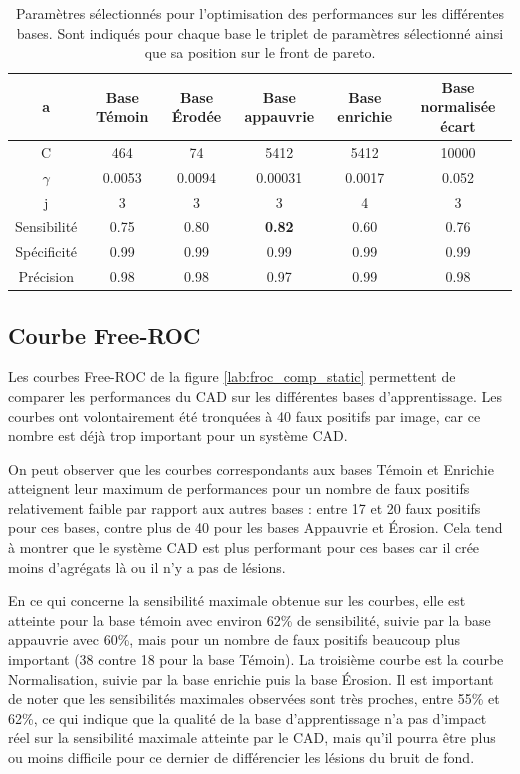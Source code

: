 \begin{table}[h!]
	\begin{center}
		\begin{tabular}{c c c c c c}
  \hline
  a	& Base Témoin 	& Base Érodée	& Base appauvrie& Base enrichie & Base normalisée écart\\
  \hline
 C 	& 464		& 74		& 5412		& 5412		& 10000 \\
\hline
$\gamma$& 0.0053	& 0.0094	& 0.00031	& 0.0017	& 0.052 \\
\hline
j	& 3		& 3		& 3		& 4		& 3	\\
\hline
\hline
Sensibilité& 0.75	& 0.80		& \textbf{0.82}		& 0.60		& 0.76	\\
\hline
Spécificité& 0.99	& 0.99		& 0.99		& 0.99		& 0.99 \\
\hline
Précision& 0.98		& 0.98		& 0.97		& 0.99		& 0.98 \\
\hline
 		\end{tabular}

	\end{center}
\caption{Paramètres sélectionnés pour l'optimisation des performances sur les différentes bases. Sont indiqués pour chaque base le triplet de paramètres sélectionné ainsi que sa position sur le front de pareto.}
\label{fig:paramsParams}
\end{table}

\FloatBarrier

\subsection{Courbe Free-ROC}

Les courbes Free-ROC de la figure \ref{lab:froc_comp_static} permettent de comparer les performances du CAD sur les différentes bases d'apprentissage. Les courbes ont volontairement été tronquées à 40 faux positifs par image, car ce nombre est déjà trop important pour un système CAD.

On peut observer que les courbes correspondants aux bases Témoin et Enrichie atteignent leur maximum de performances pour un nombre de faux positifs relativement faible par rapport aux autres bases : entre 17 et 20 faux positifs pour ces bases, contre plus de 40 pour les bases Appauvrie et Érosion. Cela tend à montrer que le système CAD est plus performant pour ces bases car il crée moins d'agrégats là ou il n'y a pas de lésions.

En ce qui concerne la sensibilité maximale obtenue sur les courbes, elle est atteinte pour la base témoin avec environ 62\% de sensibilité, suivie par la base appauvrie avec 60\%, mais pour un nombre de faux positifs beaucoup plus important (38 contre 18 pour la base Témoin). La troisième courbe est la courbe Normalisation, suivie par la base enrichie puis la base Érosion. Il est important de noter que les sensibilités maximales observées sont très proches, entre 55\% et 62\%, ce qui indique que la qualité de la base d'apprentissage n'a pas d'impact réel sur la sensibilité maximale atteinte par le CAD, mais qu'il pourra être plus ou moins difficile pour ce dernier de différencier les lésions du bruit de fond. 

